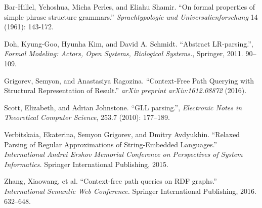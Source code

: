 \documentclass[12pt]{article}  %
\theoremstyle{definition}
\theoremstyle{remark}
\begin{document}
\begin{thebibliography}{9}

  Bar-Hillel, Yehoshua, Micha Perles, and Eliahu Shamir.
  ``On formal properties of simple phrase structure grammars.''
   \emph{Sprachtypologie und Universalienforschung}
   14 (1961): 143-172.

  Doh, Kyung-Goo, Hyunha Kim, and David A. Schmidt.
  ``Abstract LR-parsing.'',
  \emph{Formal Modeling: Actors, Open Systems, Biological Systems.},
  Springer,
  2011.
  90--109.

  Grigorev, Semyon, and Anastasiya Ragozina. 
  ``Context-Free Path Querying with Structural Representation of Result.''
   \emph{arXiv preprint arXiv:1612.08872}
    (2016).

  Scott, Elizabeth, and Adrian Johnstone.   
  ``GLL parsing.'',
  \emph{Electronic Notes in Theoretical Computer Science},
  253.7 (2010): 177--189.

  Verbitskaia, Ekaterina, Semyon Grigorev, and Dmitry Avdyukhin.
  ``Relaxed Parsing of Regular Approximations of String-Embedded Languages.''
  \emph{International Andrei Ershov Memorial Conference on Perspectives of System Informatics.}
  Springer International Publishing, 2015.

  Zhang, Xiaowang, et al.
  ``Context-free path queries on RDF graphs.'' 
  \emph{International Semantic Web Conference.}
   Springer International Publishing, 2016.
   632--648.

\end{thebibliography}
\end{document}
